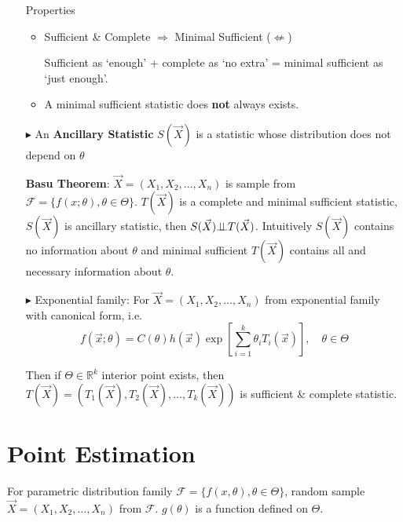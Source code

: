 \begin{itemize}
        Properties
        \begin{itemize}[topsep=2pt,itemsep=0pt]
            \item Sufficient \& Complete $\Rightarrow $ Minimal Sufficient ($ \not\Leftarrow $)
            
            Sufficient as `enough' + complete as `no extra' = minimal sufficient as `just enough'.
            

            \item A minimal sufficient statistic does \textbf{not} always exists.
        \end{itemize}
        
        \item[$\blacktriangleright$]  An \textbf{Ancillary Statistic} $S(\vec{X})$ is a statistic whose distribution does not depend on $\theta$
        
        \textbf{Basu Theorem}: $\vec{X}=(X_1,X_2,\ldots,X_n)$ is sample from $\mathscr{F}=\{f(x;\theta),\theta\in\Theta\}$. $T(\vec{X})$ is a complete and minimal sufficient statistic, $S(\vec{X})$ is ancillary statistic, then $S(\vec{X})\bot\!\!\!\bot T(\vec{X})$. Intuitively $ S(\vec{X}) $ contains no information about $ \theta  $ and minimal sufficient $ T(\vec{X}) $ contains all and necessary information about $ \theta  $.

        \item[$\blacktriangleright$] Exponential family: For $\vec{X}=(X_1,X_2,\ldots,X_n)$ from exponential family with canonical form, i.e.
    \begin{equation}
        f(\vec{x};\theta)=C(\theta)h(\vec{x})\exp\left[\sum_{i=1}^k \theta_i T_i(\vec{x})\right] ,\quad \theta\in\Theta
    \end{equation}

    Then if $\Theta\in\mathbb{R}^k$ interior point exists, then $T(\vec{X})=(T_1(\vec{X}),T_2(\vec{X}),\ldots,T_k(\vec{X}))$ is sufficient \& complete statistic.


\end{itemize} 




\section{Point Estimation}\label{SectionPointEstimation}
    For parametric distribution family $\mathscr{F}=\{f(x,\theta),\theta\in\Theta\}$, random sample $\vec{X}=(X_1,X_2,\ldots,X_n)$ from $\mathscr{F}$. $g(\theta)$ is a function defined on $\Theta$. 

